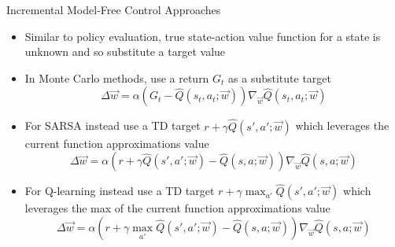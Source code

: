 \begin{frame}[c]{Incremental Model-Free Control Approaches}
	
	\begin{itemize}
		\item Similar to policy evaluation, true state-action value function for a state is unknown and so substitute a target value
		\item In Monte Carlo methods, use a return $G_t$ as a substitute target
		$$\Delta \vec{w} = \alpha(G_t - \hat{Q}(s_t,a_t; \vec{w})) \nabla_{\vec{w}} \hat{Q}(s_t, a_t; \vec{w}) $$
		\item For SARSA instead use a TD target $r+ \gamma \hat{Q}(s', a'; \vec{w})$ which leverages the current function approximations value
		$$\Delta \vec{w} = \alpha (r + \gamma \hat{Q}(s',a';\vec{w}) - \hat{Q}(s,a;\vec{w})) \nabla_{\vec{w}}\hat{Q}(s,a;\vec{w}) $$
		\item For Q-learning instead use a TD target $r + \gamma \max_{a'} \hat{Q}(s',a';\vec{w})$ which leverages the max of the current function approximations value
		$$\Delta \vec{w} = \alpha (r + \gamma \max_{a'} \hat{Q}(s',a';\vec{w}) - \hat{Q}(s,a;\vec{w})) \nabla_{\vec{w}}\hat{Q}(s,a;\vec{w}) $$
	\end{itemize}
	
\end{frame}

